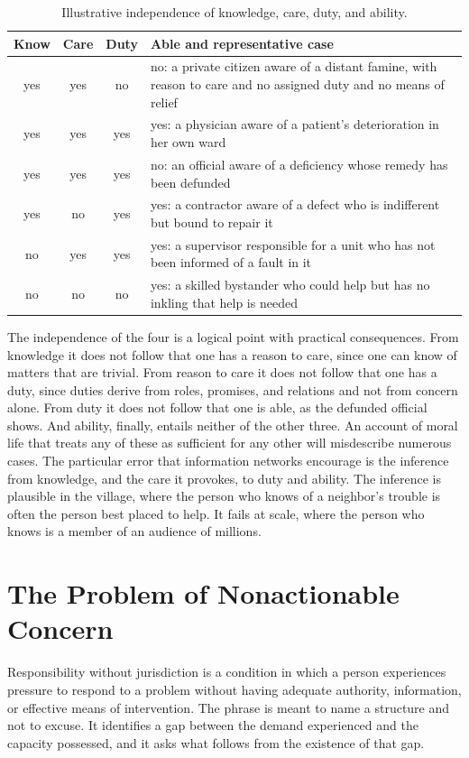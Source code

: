 \documentclass[11pt]{report}
\theoremstyle{definition}
\theoremstyle{remark}
\begin{document}
\begin{table}[ht]
\centering
\small
\begin{tabular}{@{}cccp{6.2cm}@{}}
\toprule
Know & Care & Duty & Able and representative case\\
\midrule
yes & yes & no & no: a private citizen aware of a distant famine, with reason to care and no assigned duty and no means of relief\\
yes & yes & yes & yes: a physician aware of a patient's deterioration in her own ward\\
yes & yes & yes & no: an official aware of a deficiency whose remedy has been defunded\\
yes & no & yes & yes: a contractor aware of a defect who is indifferent but bound to repair it\\
no & yes & yes & yes: a supervisor responsible for a unit who has not been informed of a fault in it\\
no & no & no & yes: a skilled bystander who could help but has no inkling that help is needed\\
\bottomrule
\end{tabular}
\caption{Illustrative independence of knowledge, care, duty, and ability.}
\label{tab:fourfold}
\end{table}

The independence of the four is a logical point with practical consequences. From knowledge it does not follow that one has a reason to care, since one can know of matters that are trivial. From reason to care it does not follow that one has a duty, since duties derive from roles, promises, and relations and not from concern alone. From duty it does not follow that one is able, as the defunded official shows. And ability, finally, entails neither of the other three. An account of moral life that treats any of these as sufficient for any other will misdescribe numerous cases. The particular error that information networks encourage is the inference from knowledge, and the care it provokes, to duty and ability. The inference is plausible in the village, where the person who knows of a neighbor's trouble is often the person best placed to help. It fails at scale, where the person who knows is a member of an audience of millions.

\section{The Problem of Nonactionable Concern}

Responsibility without jurisdiction is a condition in which a person experiences pressure to respond to a problem without having adequate authority, information, or effective means of intervention. The phrase is meant to name a structure and not to excuse. It identifies a gap between the demand experienced and the capacity possessed, and it asks what follows from the existence of that gap.
\end{document}
